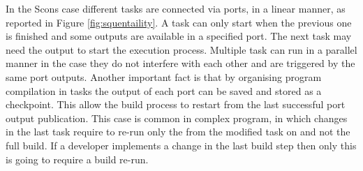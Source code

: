 \documentclass[../main.tex]{subfiles}
\begin{document}
In the Scons case different tasks are connected via ports, in a linear manner, as reported in Figure \ref{fig:squentaility}. A task can only start when the previous one is finished and some outputs are available in a specified port. The next task may need the output to start the execution process. Multiple task can run in a parallel manner in the case they do not interfere with each other and are triggered by the same port outputs. Another important fact is that by organising program compilation in tasks the output of each port can be saved and stored as a checkpoint. This allow the build process to restart from the last successful port output publication. This case is common in complex program, in which changes in the last task require to re-run only the from the modified task on and not the full build. If a developer implements a change in the last build step then only this is going to require a build re-run. 
\end{document}
